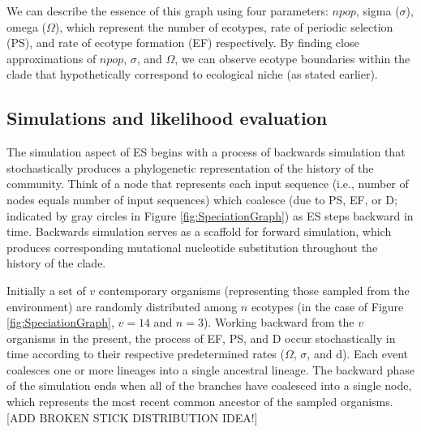 We can describe the essence of this graph using four parameters: $npop$, sigma ($\sigma$), omega ($\Omega$), which represent the number of ecotypes, rate of periodic selection (PS), and rate of ecotype formation (EF) respectively.
By finding close approximations of $npop$, $\sigma$, and $\Omega$, we can observe ecotype boundaries within the clade that hypothetically correspond to ecological niche (as stated earlier).

\subsection*{Simulations and likelihood evaluation}
The simulation aspect of ES begins with a process of backwards simulation that stochastically produces a phylogenetic representation of the history of the community.
Think of a node that represents each input sequence (i.e., number of nodes equals number of input sequences) which coalesce (due to PS, EF, or D; indicated by gray circles in Figure \ref{fig:SpeciationGraph}) as ES steps backward in time.
Backwards simulation serves as a scaffold for forward simulation, which produces corresponding mutational nucleotide substitution throughout the history of the clade.

Initially a set of $v$ contemporary organisms (representing those sampled from the environment) are randomly distributed among $n$ ecotypes (in the case of Figure \ref{fig:SpeciationGraph}, $v = 14$ and $n = 3$).
Working backward from the $v$ organisms in the present, the process of EF, PS, and D occur stochastically in time according to their respective predetermined rates ($\Omega$, $\sigma$, and d).
Each event coalesces one or more lineages into  a single ancestral lineage.
The backward phase of the simulation ends when all of the branches have coalesced into a single node, which represents the most recent common ancestor of the sampled organisms.
[ADD BROKEN STICK DISTRIBUTION IDEA!]

